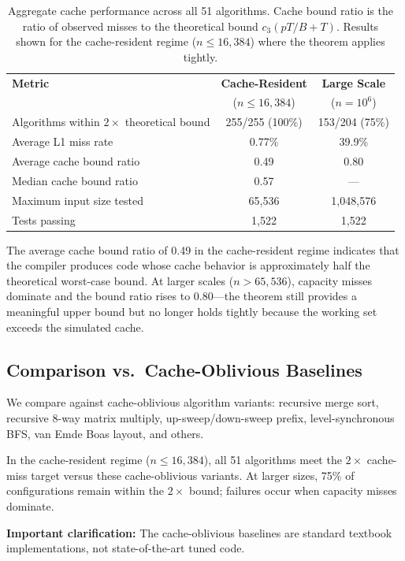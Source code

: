 \documentclass[11pt]{article}
\begin{document}
\begin{table}[t]
\centering
\caption{Aggregate cache performance across all 51 algorithms.
  Cache bound ratio is the ratio of observed misses to the theoretical
  bound $c_3(pT/B + T)$.  Results shown for the cache-resident regime
  ($n \le 16{,}384$) where the theorem applies tightly.}
\label{tab:cache_summary}
\begin{tabular}{@{}lcc@{}}
\toprule
\textbf{Metric} & \textbf{Cache-Resident} & \textbf{Large Scale} \\
 & ($n \le 16{,}384$) & ($n = 10^6$) \\
\midrule
Algorithms within $2\times$ theoretical bound & 255/255 (100\%) & 153/204 (75\%) \\
Average L1 miss rate & 0.77\% & 39.9\% \\
Average cache bound ratio & 0.49 & 0.80 \\
Median cache bound ratio & 0.57 & --- \\
Maximum input size tested & 65,536 & 1,048,576 \\
Tests passing & 1,522 & 1,522 \\
\bottomrule
\end{tabular}
\end{table}

The average cache bound ratio of 0.49 in the cache-resident regime
indicates that the compiler produces code whose cache behavior is
approximately half the theoretical worst-case bound.  At larger scales
($n > 65{,}536$), capacity misses dominate and the bound ratio rises to
0.80---the theorem still provides a meaningful upper bound but no longer
holds tightly because the working set exceeds the simulated cache.

\subsection{Comparison vs.\ Cache-Oblivious Baselines}

We compare against cache-oblivious algorithm variants: recursive merge
sort, recursive 8-way matrix multiply, up-sweep/down-sweep prefix,
level-synchronous BFS, van Emde Boas layout, and others.

In the cache-resident regime ($n \le 16{,}384$), all 51 algorithms meet
the $2\times$ cache-miss target versus these cache-oblivious variants.
At larger sizes, 75\% of configurations remain within the $2\times$
bound; failures occur when capacity misses dominate.

\textbf{Important clarification:} The cache-oblivious baselines are
standard textbook implementations, not state-of-the-art tuned code.
\end{document}
